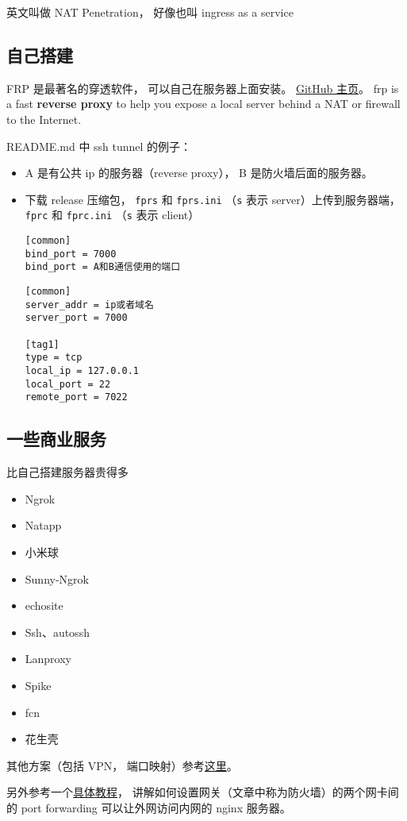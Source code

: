 
\begin{issues}
\issueDraft
\end{issues}

英文叫做 NAT Penetration， 好像也叫 ingress as a service

\subsection{自己搭建}
FRP 是最著名的穿透软件， 可以自己在服务器上面安装。 \href{https://github.com/fatedier/frp}{GitHub 主页}。
frp is a fast \textbf{reverse proxy} to help you expose a local server behind a NAT or firewall to the Internet.

README.md 中 ssh tunnel 的例子：
\begin{itemize}
\item A 是有公共 ip 的服务器（reverse proxy）， B 是防火墙后面的服务器。
\item 下载 release 压缩包， \verb|fprs| 和 \verb|fprs.ini| （\verb|s| 表示 server）上传到服务器端， \verb|fprc| 和 \verb|fprc.ini| （\verb|s| 表示 client）
\begin{lstlisting}[language=none,caption=fprs.ini]
[common]
bind_port = 7000
bind_port = A和B通信使用的端口
\end{lstlisting}
\begin{lstlisting}[language=none,caption=fprc.ini]
[common]
server_addr = ip或者域名
server_port = 7000

[tag1]
type = tcp
local_ip = 127.0.0.1
local_port = 22
remote_port = 7022
\end{lstlisting}
\end{itemize}

\subsection{一些商业服务}
比自己搭建服务器贵得多
\begin{itemize}
\item Ngrok
\item Natapp
\item 小米球
\item Sunny-Ngrok
\item echosite
\item Ssh、autossh
\item Lanproxy
\item Spike
\item fcn
\item 花生壳
\end{itemize}

其他方案（包括 VPN， 端口映射）参考\href{https://johackim.com/how-to-expose-local-server-behind-firewall}{这里}。

另外参考一个\href{https://www.digitalocean.com/community/tutorials/how-to-forward-ports-through-a-linux-gateway-with-iptables}{具体教程}， 讲解如何设置网关（文章中称为防火墙）的两个网卡间的 port forwarding 可以让外网访问内网的 nginx 服务器。 
